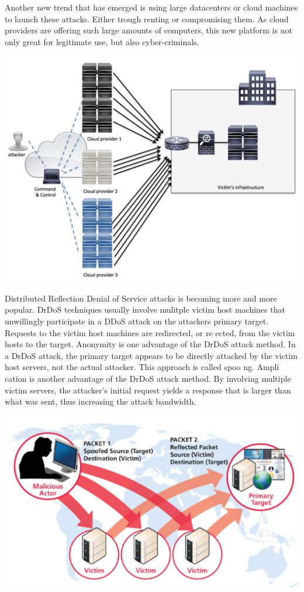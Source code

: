 Another new trend that has emerged is using large datacenters or cloud machines to launch these attacks. Either trough renting or compromising them. As cloud providers are offering such large amounts of computers, this new platform is not only great for legitimate use, but also cyber-criminals.

\includegraphics[scale=0.2]{cloud}

Distributed Reflection Denial of Service attacks is becoming more and more popular. DrDoS techniques usually involve mulitple victim host machines that unwillingly participate in a DDoS attack on the attackers primary target. Requests to the victim host machines are redirected, or re ected, from the victim hosts to the target. Anonymity is one advantage of the DrDoS attack method. In a DrDoS attack, the primary target appears to be directly attacked by the victim host servers, not the actual attacker. This approach is called spoo ng.
Ampli cation is another advantage of the DrDoS attack method. By involving multiple victim servers, the attacker’s initial request yields a response that is larger than what was sent, thus increasing the attack bandwidth.

\includegraphics[scale=0.2]{drdos}

